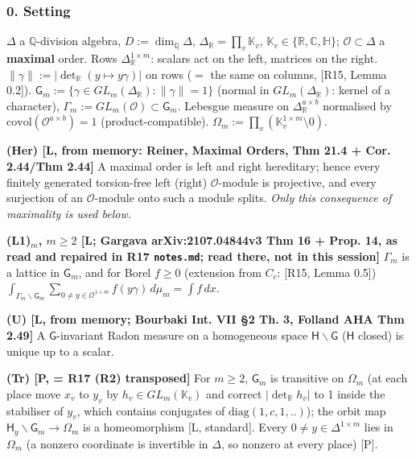 \hypertarget{setting}{%
\subsubsection*{0. Setting}\label{setting}}

\(\Delta\) a \(\mathbb Q\)-division algebra, \(D:=\dim_{\mathbb Q}\Delta\), \(\Delta_{\mathbb R}=\prod_v\mathbb K_v\), \(\mathbb K_v\in\{\mathbb R,\mathbb C,\mathbb H\}\); \(\mathcal O\subset\Delta\) a \textbf{maximal} order. Rows \(\Delta_{\mathbb R}^{1\times m}\): scalars act on the left, matrices on the right. \(\|\gamma\|:=|\det_{\mathbb R}(y\mapsto y\gamma)|\) on rows (\(=\) the same on columns, {[}R15, Lemma 0.2{]}). \(\mathsf G_m:=\{\gamma\in GL_m(\Delta_{\mathbb R}):\|\gamma\|=1\}\) (normal in \(GL_m(\Delta_{\mathbb R})\): kernel of a character), \(\Gamma_m:=GL_m(\mathcal O)\subset\mathsf G_m\). Lebesgue measure on \(\Delta_{\mathbb R}^{a\times b}\) normalised by \(\mathrm{covol}(\mathcal O^{a\times b})=1\) (product-compatible). \(\Omega_m:=\prod_v(\mathbb K_v^{1\times m}\setminus0)\).

\textbf{(Her) {[}L, from memory: Reiner, Maximal Orders, Thm 21.4 + Cor. 2.44/Thm 2.44{]}} A maximal order is left and right hereditary; hence every finitely generated torsion-free left (right) \(\mathcal O\)-module is projective, and every surjection of an \(\mathcal O\)-module onto such a module splits. \emph{Only this consequence of maximality is used below.}

\textbf{(L1)\(_m\), \(m\ge2\) {[}L; Gargava arXiv:2107.04844v3 Thm 16 + Prop. 14, as read and repaired in R17 \texttt{notes.md}; read there, not in this session{]}} \(\Gamma_m\) is a lattice in \(\mathsf G_m\), and for Borel \(f\ge0\) (extension from \(C_c\): {[}R15, Lemma 0.5{]}) \(\int_{\Gamma_m\backslash\mathsf G_m}\sum_{0\ne y\in\mathcal O^{1\times m}}f(y\gamma)\,d\mu_m=\int f\,dx\).

\textbf{(U) {[}L, from memory; Bourbaki Int. VII §2 Th. 3, Folland AHA Thm 2.49{]}} A \(\mathsf G\)-invariant Radon measure on a homogeneous space \(\mathsf H\backslash\mathsf G\) (\(\mathsf H\) closed) is unique up to a scalar.

\textbf{(Tr) {[}P, = R17 (R2) transposed{]}} For \(m\ge2\), \(\mathsf G_m\) is transitive on \(\Omega_m\) (at each place move \(x_v\) to \(y_v\) by \(h_v\in GL_m(\mathbb K_v)\) and correct \(|\det_{\mathbb R}h_v|\) to 1 inside the stabiliser of \(y_v\), which contains conjugates of \(\mathrm{diag}(1,c,1,..)\)); the orbit map \(\mathsf H_y\backslash\mathsf G_m\to\Omega_m\) is a homeomorphism {[}L, standard{]}. Every \(0\ne y\in\Delta^{1\times m}\) lies in \(\Omega_m\) (a nonzero coordinate is invertible in \(\Delta\), so nonzero at every place) {[}P{]}.

